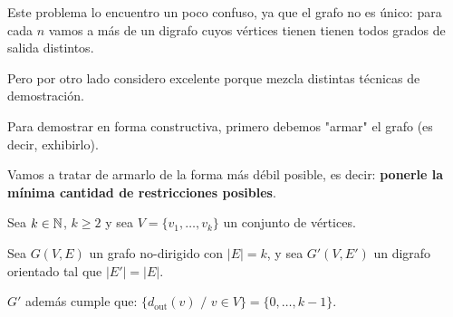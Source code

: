 \documentclass[12pt,a4paper]{article}
\begin{document}
\demoline

\par Este problema lo encuentro un poco confuso, ya que el grafo no es único: para cada \ensuremath{n} vamos a más de un digrafo cuyos vértices tienen tienen todos grados de salida distintos.
\par Pero por otro lado considero excelente porque mezcla distintas técnicas de demostración.
\demoline

\par Para demostrar en forma constructiva, primero debemos "armar" el grafo (es decir, exhibirlo).
\par Vamos a tratar de armarlo de la forma más débil posible, es decir: \textbf{ponerle la mínima cantidad de restricciones posibles}.

\demoline

\par Sea \ensuremath{k \in \natt}, \ensuremath{k \geq 2} y sea \ensuremath{V = \{v_1, \dots, v_k\}} un conjunto de vértices.
\par Sea \ensuremath{G(V, E)} un grafo no-dirigido con \ensuremath{|E| = k}, y sea \ensuremath{G'(V, E')}  un digrafo orientado tal que \ensuremath{|E'| = |E|}.
\par \ensuremath{G'} además cumple que: \ensuremath{\{d_\text{out}(v)\text{ / } v \in V\} = \{0, \dots, k-1\}}.
\end{document}
